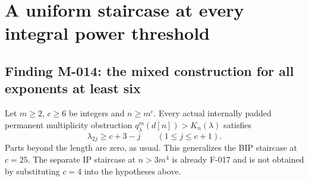 \section{A uniform staircase at every integral power threshold}

\subsection*{Finding M-014: the mixed construction for all exponents at least six}
Let \(m\geq2\), \(c\geq6\) be integers and \(n\geq m^c\).
Every actual internally padded permanent multiplicity obstruction
\(q^m_\lambda(d[n])>K_n(\lambda)\) satisfies
\begin{equation}\label{eq:M014stairs}
             \lambda_{2j}\geq c+3-j
                         \qquad(1\leq j\leq c+1).
\end{equation}
Parts beyond the length are zero, as usual. This generalizes
the BIP staircase at \(c=25\). The separate IP staircase
at \(n>3m^4\) is already F-017 and is not obtained by
substituting \(c=4\) into the hypotheses above.

